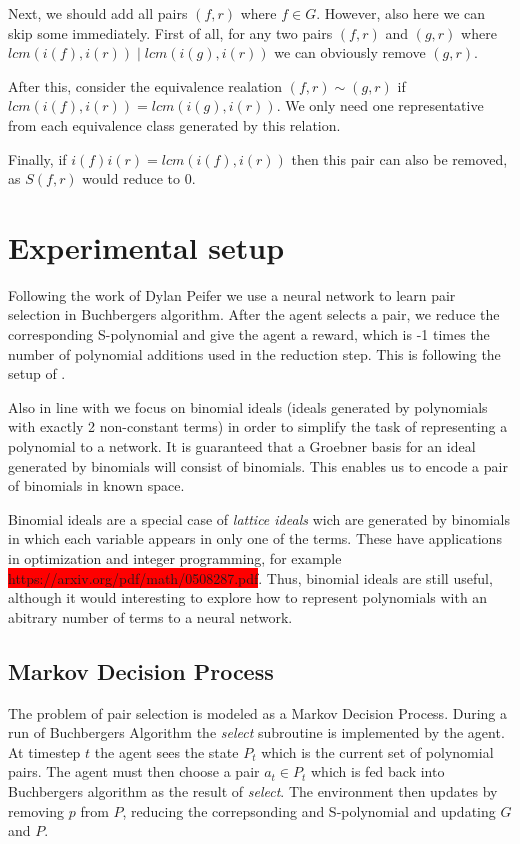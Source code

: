 \documentclass{article}
\theoremstyle{changedot}
\theoremstyle{changedotbreak}
\theoremstyle{nonumberplain}
\begin{document}
Next, we should add all pairs $(f, r)$ where $f \in G$. However, also here we can skip some immediately. First of all, for any two pairs $(f, r)$ and $(g, r)$ where $lcm(i(f), i(r)) \mid lcm(i(g), i(r))$ we can obviously remove $(g, r)$.

After this, consider the equivalence realation $(f, r) \sim (g, r)$ if $lcm(i(f), i(r)) = lcm(i(g), i(r))$. We only need one representative from each equivalence class generated by this relation.

Finally, if $i(f)i(r) = lcm(i(f), i(r))$ then this pair can also be removed, as $S(f, r)$ would reduce to $0$.



\section{Experimental setup}
Following the work of Dylan Peifer \cite{peifer} we use a neural network to learn pair selection in Buchbergers algorithm. After the agent selects a pair, we reduce the corresponding S-polynomial and give the agent a reward, which is -1 times the number of polynomial additions used in the reduction step. This is following the setup of \cite{peifer}.

Also in line with \cite{peifer} we focus on binomial ideals (ideals generated by polynomials with exactly 2 non-constant terms) in order to simplify the task of representing a polynomial to a network. It is guaranteed that a Groebner basis for an ideal generated by binomials will consist of binomials. This enables us to encode a pair of binomials in known space.

Binomial ideals are a special case of \emph{lattice ideals} wich are generated by binomials in which each variable appears in only one of the terms. These have applications in optimization and integer programming, for example \colorbox{red}{https://arxiv.org/pdf/math/0508287.pdf}. Thus, binomial ideals are still useful, although it would interesting to explore how to represent polynomials with an abitrary number of terms to a neural network.

\subsection{Markov Decision Process}
The problem of pair selection is modeled as a Markov Decision Process. During a run of Buchbergers Algorithm the \emph{select} subroutine is implemented by the agent. At timestep $t$ the agent sees the state $P_{t}$ which is the current set of polynomial pairs. The agent must then choose a pair $a_{t} \in P_{t}$ which is fed back into Buchbergers algorithm as the result of \emph{select}. The environment then updates by removing $p$ from $P$, reducing the correpsonding and S-polynomial and updating $G$ and $P$.
\end{document}
